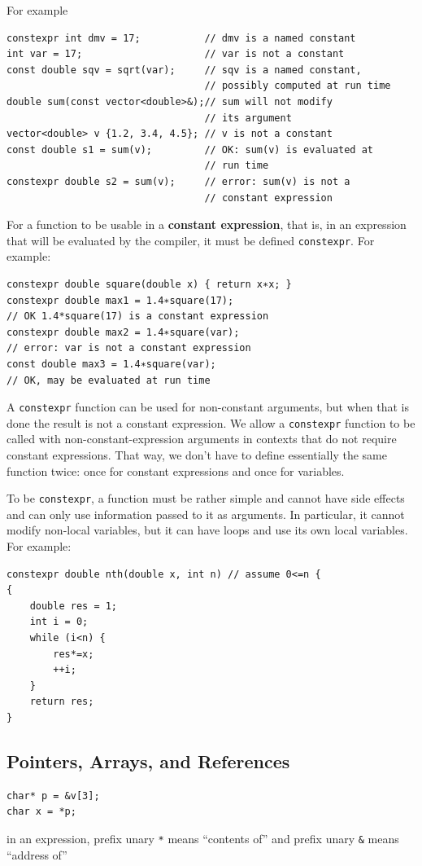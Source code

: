 \documentclass[11pt]{article}
\begin{document}
For example
\begin{verbatim}
constexpr int dmv = 17;           // dmv is a named constant
int var = 17;                     // var is not a constant
const double sqv = sqrt(var);     // sqv is a named constant,
                                  // possibly computed at run time
double sum(const vector<double>&);// sum will not modify
                                  // its argument
vector<double> v {1.2, 3.4, 4.5}; // v is not a constant
const double s1 = sum(v);         // OK: sum(v) is evaluated at
                                  // run time
constexpr double s2 = sum(v);     // error: sum(v) is not a
                                  // constant expression
\end{verbatim}

For a function to be usable in a \textbf{constant expression}, that is, in an expression that will be
evaluated by the compiler, it must be defined \texttt{constexpr}. For example:
\begin{verbatim}
constexpr double square(double x) { return x∗x; }
constexpr double max1 = 1.4∗square(17);
// OK 1.4*square(17) is a constant expression
constexpr double max2 = 1.4∗square(var);
// error: var is not a constant expression 
const double max3 = 1.4∗square(var);
// OK, may be evaluated at run time
\end{verbatim}

A \texttt{constexpr} function can be used for non-constant arguments, but when that is done the result is
not a constant expression. We allow a \texttt{constexpr} function to be called with
non-constant-expression arguments in contexts that do not require constant expressions. That
way, we don’t have to define essentially the same function twice: once for constant expressions
and once for variables.

To be \texttt{constexpr}, a function must be rather simple and cannot have side effects and can only use
information passed to it as arguments. In particular, it cannot modify non-local variables, but
it can have loops and use its own local variables. For example:
\begin{verbatim}
constexpr double nth(double x, int n) // assume 0<=n {
{
    double res = 1;
    int i = 0;
    while (i<n) {
        res*=x;
        ++i;
    }
    return res;
}
\end{verbatim}
\subsection{Pointers, Arrays, and References}
\label{sec:orgd7ecdad}
\begin{verbatim}
char* p = &v[3];
char x = *p;
\end{verbatim}
in an expression, prefix unary \texttt{*} means ``contents of'' and prefix unary \texttt{\&} means ``address of''
\end{document}
